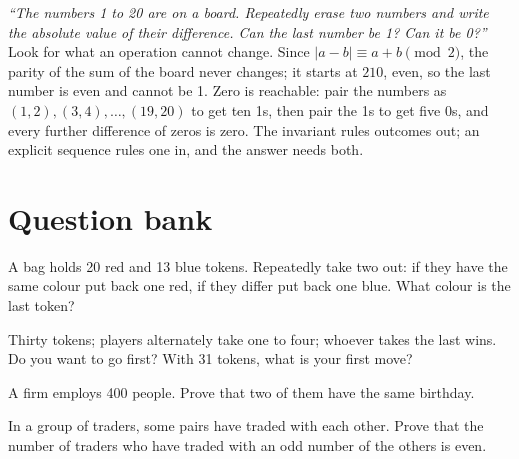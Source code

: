 \begin{example}\label{ex:iv:brainteasers-and-logic:diff}
\emph{``The numbers 1 to 20 are on a board. Repeatedly erase two numbers and write the absolute value of their
difference. Can the last number be 1? Can it be 0?''} Look for what an operation cannot change. Since $|a - b| \equiv a +
b \pmod 2$, the parity of the sum of the board never changes; it starts at $210$, even, so the last number is even and
cannot be 1. Zero is reachable: pair the numbers as $(1,2), (3,4), \dots, (19,20)$ to get ten 1s, then pair the 1s to
get five 0s, and every further difference of zeros is zero. The invariant rules outcomes out; an explicit sequence rules
one in, and the answer needs both.
\end{example}

\section{Question bank}

\begin{interviewq}\label{iq:iv:brainteasers-and-logic:1}
A bag holds 20 red and 13 blue tokens. Repeatedly take two out: if they have the same colour put back one red,
if they differ put back one blue. What colour is the last token?
\end{interviewq}

\begin{interviewq}\label{iq:iv:brainteasers-and-logic:2}
Thirty tokens; players alternately take one to four; whoever takes the last wins. Do you want to go first? With
31 tokens, what is your first move?
\end{interviewq}

\begin{interviewq}\label{iq:iv:brainteasers-and-logic:3}
A firm employs 400 people. Prove that two of them have the same birthday.
\end{interviewq}

\begin{interviewq}\label{iq:iv:brainteasers-and-logic:4}
In a group of traders, some pairs have traded with each other. Prove that the number of traders who have traded
with an odd number of the others is even.
\end{interviewq}

